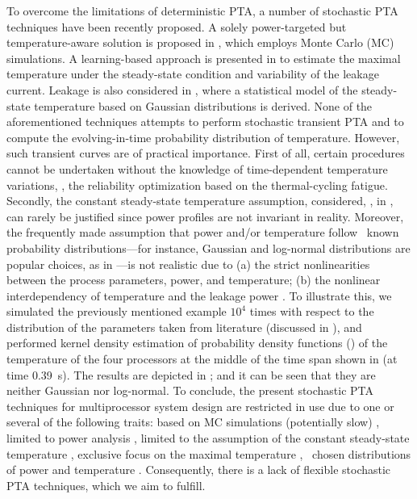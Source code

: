 
To overcome the limitations of deterministic PTA, a number of stochastic PTA techniques have been recently proposed.
A solely power-targeted but temperature-aware solution is proposed in \cite{chandra2010}, which employs Monte Carlo (MC) simulations.
A learning-based approach is presented in \cite{juan2011} to estimate the maximal temperature under the steady-state condition and variability of the leakage current.
Leakage is also considered in \cite{juan2012}, where a statistical model of the steady-state temperature based on Gaussian distributions is derived.
None of the aforementioned techniques attempts to perform stochastic transient PTA and to compute the evolving-in-time probability distribution of temperature.
However, such transient curves are of practical importance.
First of all, certain procedures cannot be undertaken without the knowledge of time-dependent temperature variations, \eg, the reliability optimization based on the thermal-cycling fatigue. Secondly, the constant steady-state temperature assumption, considered, \eg, in \cite{juan2011, juan2012}, can rarely be justified since power profiles are not invariant in reality.
Moreover, the frequently made assumption that power and/or temperature follow \apriori\ known probability distributions---for instance, Gaussian and log-normal distributions are popular choices, as in \cite{juan2012, srivastava2010}---is not realistic due to (a) the strict nonlinearities between the process parameters, power, and temperature; (b) the nonlinear interdependency of temperature and the leakage power \cite{liu2007}.
To illustrate this, we simulated the previously mentioned example $10^4$ times with respect to the distribution of the parameters taken from literature (discussed in ), and performed kernel density estimation of probability density functions (\pdfs) of the temperature of the four processors at the middle of the time span shown in  (at time 0.39~s).
The results are depicted in ; and it can be seen that they are neither Gaussian nor log-normal.
To conclude, the present stochastic PTA techniques for multiprocessor system design are restricted in use due to one or several of the following traits: based on MC simulations (potentially slow) \cite{chandra2010}, limited to power analysis \cite{chandra2010}, limited to the assumption of the constant steady-state temperature \cite{juan2011, juan2012}, exclusive focus on the maximal temperature \cite{juan2011}, \apriori\ chosen distributions of power and temperature \cite{juan2012, srivastava2010}.
Consequently, there is a lack of flexible stochastic PTA techniques, which we aim to fulfill.


